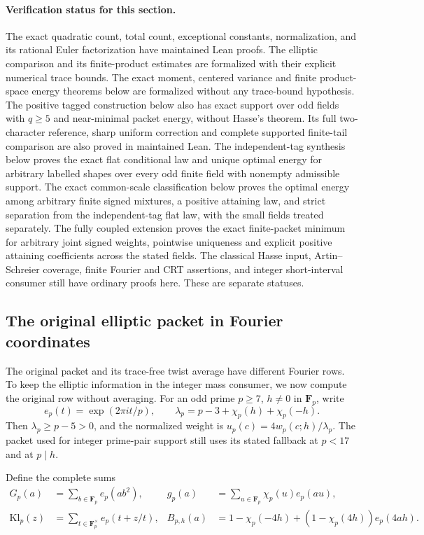 \documentclass[11pt]{article}
\newcommand{\F}{\mathbf F}
\begin{document}
\paragraph{Verification status for this section.}
The exact quadratic count, total count, exceptional constants,
normalization, and its rational Euler factorization have maintained
Lean proofs.
The elliptic comparison and its finite-product estimates are formalized
with their explicit numerical trace bounds. The exact moment, centered
variance and finite product-space energy theorems below are formalized
without any trace-bound hypothesis.
The positive tagged construction below also has exact support over odd
fields with \(q\geq5\) and near-minimal packet energy, without Hasse's theorem.
Its full two-character reference, sharp uniform correction and complete
supported finite-tail comparison are also proved in maintained Lean.
The independent-tag synthesis below proves the exact flat conditional
law and unique optimal energy for arbitrary labelled shapes over every
odd finite field with nonempty admissible support.
The exact common-scale classification below proves the optimal energy
among arbitrary finite signed mixtures, a positive attaining law, and
strict separation from the independent-tag flat law, with the small
fields treated separately.
The fully coupled extension proves the exact finite-packet minimum
for arbitrary joint signed weights, pointwise uniqueness and explicit
positive attaining coefficients across the stated fields.
The classical Hasse input, Artin--Schreier coverage, finite Fourier
and CRT assertions, and integer short-interval consumer still have
ordinary proofs here. These are separate statuses.

\subsection{The original elliptic packet in Fourier coordinates}
The original packet and its trace-free twist average have different
Fourier rows. To keep the elliptic information in the integer mass
consumer, we now compute the original row without averaging.
For an odd prime \(p\geq7\), \(h\ne0\) in \(\F_p\), write
\[
 e_p(t)=\exp(2\pi i t/p),\qquad
 \lambda_p=p-3+\chi_p(h)+\chi_p(-h).
\]
Then \(\lambda_p\geq p-5>0\), and the normalized weight is
\(u_p(c)=4w_p(c;h)/\lambda_p\). The packet used for integer
prime-pair support still uses its stated fallback at \(p<17\)
and at \(p\mid h\).

Define the complete sums
\begin{align*}
 G_p(a)&=\sum_{b\in\F_p}e_p(ab^2),&
 g_p(a)&=\sum_{u\in\F_p}\chi_p(u)e_p(au),\\
 \mathrm{Kl}_p(z)&=\sum_{t\in\F_p^\times}e_p(t+z/t),&
 B_{p,h}(a)&=1-\chi_p(-4h)+(1-\chi_p(4h))e_p(4ah).
\end{align*}
\end{document}
